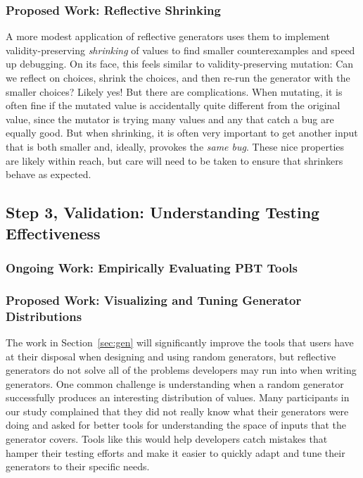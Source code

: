 \subsubsection{Proposed Work: Reflective Shrinking}
A more modest application of reflective generators uses them to implement
validity-preserving {\em shrinking} of values to find smaller counterexamples
and speed up debugging. On its face, this feels similar to validity-preserving
mutation: Can we reflect on choices, shrink the choices, and then re-run the
generator with the smaller choices? Likely yes! But there are complications.
When mutating, it is often fine if the mutated value is accidentally quite
different from the original value, since the mutator is trying many values and
any that catch a bug are equally good. But when shrinking, it is often very
important to get another input that is both smaller and, ideally, provokes the
{\em same bug}. These nice properties are likely within reach, but care will
need to be taken to ensure that shrinkers behave as expected.

\subsection{Step 3, Validation: Understanding Testing Effectiveness }\label{sec:val}
\subsubsection{Ongoing Work: Empirically Evaluating PBT Tools}

\subsubsection{Proposed Work: Visualizing and Tuning Generator Distributions}
\newcommand{\genvis}{GenVis}
The work in Section~\ref{sec:gen} will significantly improve the tools that
users have at their disposal when designing and using random generators, but
reflective generators do not solve all of the problems developers may run into
when writing generators. One common challenge is understanding when a random
generator successfully produces an interesting distribution of values. Many
participants in our study complained that they did not really know what their
generators were doing and asked for better tools for understanding the space of
inputs that the generator covers. Tools like this would help developers catch
mistakes that hamper their testing efforts and make it easier to quickly adapt
and tune their generators to their specific needs.

